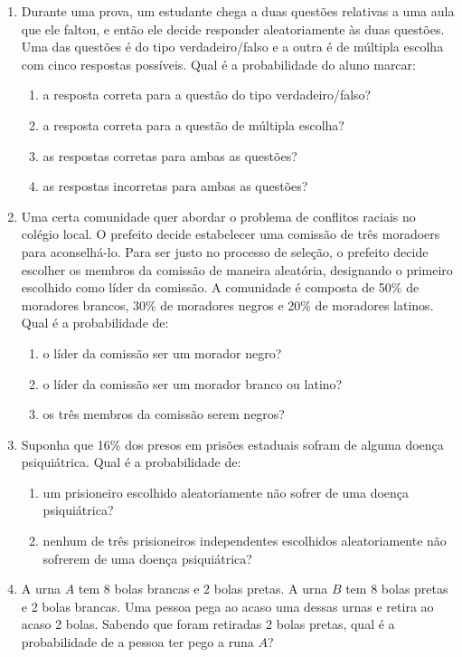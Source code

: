 \documentclass{article}
\begin{document}
\begin{enumerate}
	
	\item Durante uma prova, um estudante chega a duas questões relativas a uma aula que ele faltou, e então ele decide responder aleatoriamente às duas questões. Uma das questões é do tipo verdadeiro/falso e a outra é de múltipla escolha com cinco respostas possíveis. Qual é a probabilidade do aluno marcar:
\begin{enumerate}
	\item a resposta correta para a questão do tipo verdadeiro/falso?
	\item a resposta correta para a questão de múltipla escolha?
	\item as respostas corretas para ambas as questões? 
	\item as respostas incorretas para ambas as questões?
\end{enumerate}	 


\item Uma certa comunidade quer abordar o problema de conflitos raciais no colégio local. O prefeito decide estabelecer uma comissão de três moradoers para aconselhá-lo. Para ser justo no processo de seleção, o prefeito decide escolher os membros da comissão de maneira aleatória, designando o primeiro escolhido como líder da comissão. A comunidade é composta de 50\% de moradores brancos, 30\% de moradores negros e 20\% de moradores latinos. Qual é a probabilidade de:
\begin{enumerate}
	\item o líder da comissão ser um morador negro?
	\item o líder da comissão ser um morador branco ou latino?
	\item os três membros da comissão serem negros?
\end{enumerate}
    

	
	\item Suponha que 16\% dos presos em prisões estaduais sofram de alguma doença psiquiátrica. Qual é a probabilidade de:
	\begin{enumerate}
		\item um prisioneiro escolhido aleatoriamente não sofrer de uma doença psiquiátrica?
		\item nenhum de três prisioneiros independentes escolhidos aleatoriamente não sofrerem de uma doença psiquiátrica?
	\end{enumerate}
 
\item A urna $A$ tem 8 bolas brancas e 2 bolas pretas. A urna $B$ tem 8 bolas pretas e 2 bolas brancas. Uma pessoa pega ao acaso uma dessas urnas e retira ao acaso 2 bolas. Sabendo que foram retiradas 2 bolas pretas, qual é a probabilidade de a pessoa ter pego a runa $A$?
    

\end{enumerate}
\end{document}
